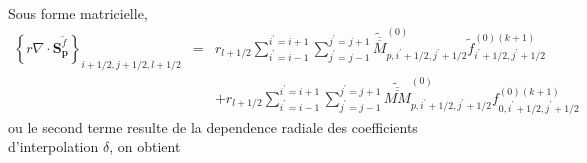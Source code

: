 Sous forme matricielle, \begin{eqnarray*}
\left\{ r\nabla\cdot\mathbf{S}_{\mathbf{p}}^{\widetilde{f}}\right\} _{i+1/2,j+1/2,l+1/2} & = & r_{l+1/2}\sum_{i^{\prime}=i-1}^{i^{\prime}=i+1}\sum_{j^{\prime}=j-1}^{j^{\prime}=j+1}\widetilde{\overline{\overline{M}}}_{p,i^{\prime}+1/2,j^{\prime}+1/2}^{\left(0\right)}\widetilde{f}_{i^{\prime}+1/2,j^{\prime}+1/2}^{\left(0\right)(k+1)}\\
 &  & +r_{l+1/2}\sum_{i^{\prime}=i-1}^{i^{\prime}=i+1}\sum_{j^{\prime}=j-1}^{j^{\prime}=j+1}\widetilde{\overline{\overline{MM}}}_{p,i^{\prime}+1/2,j^{\prime}+1/2}^{\left(0\right)}f_{0,i^{\prime}+1/2,j^{\prime}+1/2}^{\left(0\right)(k+1)}\end{eqnarray*}
 ou le second terme resulte de la dependence radiale des coefficients
d'interpolation $\delta$, on obtient

